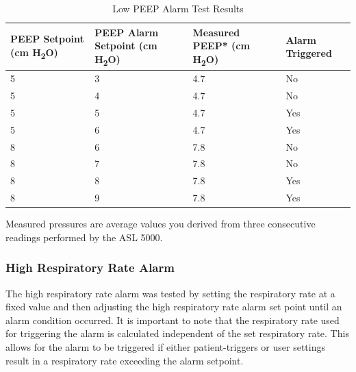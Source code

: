 \documentclass[]{article}
\begin{document}
\begin{center}
	\begin{table}[h]
		\caption{Low PEEP Alarm Test Results}
		\label{tab:low_peep_test}
		\begin{tabular}{ |p{3.7cm}|p{3.3cm}|p{4cm}| p{2.9cm}|}
			
			\hline
			\textbf{PEEP Setpoint (cm H\textsubscript{2}O)} & \textbf{PEEP Alarm Setpoint (cm H\textsubscript{2}O)} & \textbf{Measured PEEP* (cm H\textsubscript{2}O)} & \textbf{Alarm Triggered}  \\ \hline
			5 & 3 & 4.7 & No\\ \hline
			5 & 4 & 4.7& No\\ \hline
			5 & 5 & 4.7 & Yes\\ \hline
			5 & 6 & 4.7 & Yes\\ \hline
			8 & 6 & 7.8 & No\\ \hline
			8 & 7 & 7.8 & No\\ \hline
			8 & 8 & 7.8 & Yes\\ \hline
			8 & 9 & 7.8 & Yes\\ \hline
		\end{tabular}
		\noindent *Measured pressures are average values you derived from three consecutive readings performed by the ASL 5000.
	\end{table}	
\end{center}

\subsubsection{High Respiratory Rate Alarm}
The high respiratory rate alarm was tested by setting the respiratory rate at a fixed value and then adjusting the high respiratory rate alarm set point until an alarm condition occurred.  It is important to note that the respiratory rate used for triggering the alarm is calculated independent of the set respiratory rate.  This allows for the alarm to be triggered if either patient-triggers or user settings result in a respiratory rate exceeding the alarm setpoint.
\end{document}
